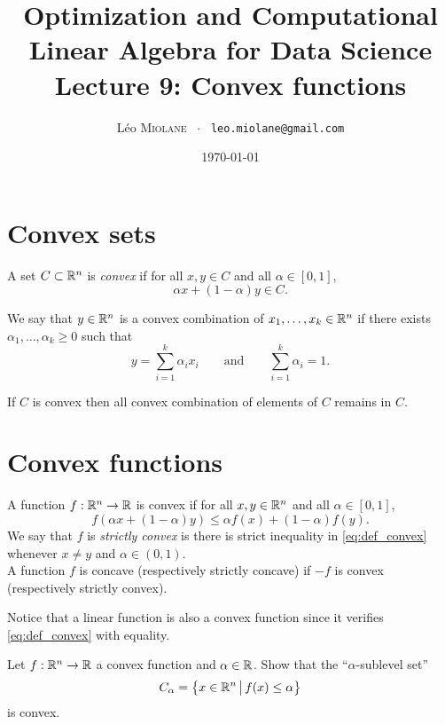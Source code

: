 \documentclass[11pt,nocut]{article}
\title{\vspace{-2.0cm}%
	Optimization and Computational Linear Algebra for Data Science\\
Lecture 9: Convex functions}
\author{Léo \textsc{Miolane} \ $\cdot$ \ \texttt{leo.miolane@gmail.com}}
\date{\today}
\begin{document}
\maketitle


\section{Convex sets}

\begin{definition}
	A set $C \subset \mathbb{R}^n$ is \emph{convex} if for all $x,y \in C$ and all $\alpha \in [0,1]$,
	$$
	\alpha x + (1-\alpha) y \in C.
	$$
\end{definition}

\begin{definition}
	We say that $y \in \mathbb{R}^n$ is a convex combination of $x_1, \dots, x_k \in \mathbb{R}^n$ if there exists $\alpha_1, \dots, \alpha_k \geq 0$ such that
	$$
	y = \sum_{i=1}^k \alpha_i x_i \qquad \text{and} \qquad \sum_{i=1}^k \alpha_i = 1.
	$$
\end{definition}

\begin{proposition}
	If $C$ is convex then all convex combination of elements of $C$ remains in $C$.
\end{proposition}

\section{Convex functions}

\begin{definition}
	A function $f: \mathbb{R}^n \to \mathbb{R}$ is convex if for all $x,y \in \mathbb{R}^n$ and all $\alpha \in [0,1]$,
	\begin{equation}\label{eq:def_convex}
	f(\alpha x + (1-\alpha) y) \leq \alpha f(x) + (1-\alpha) f(y).
\end{equation}
We say that $f$ is \emph{strictly convex} is there is strict inequality in \eqref{eq:def_convex} whenever $x \neq y$ and $\alpha \in (0,1)$.
\\
A function $f$ is concave (respectively strictly concave) if $-f$ is convex (respectively strictly convex).
\end{definition}

Notice that a linear function is also a convex function since it verifies \eqref{eq:def_convex} with equality.


\begin{exercise}
	Let $f : \mathbb{R}^n \to \mathbb{R}$ a convex function and $\alpha \in \mathbb{R}$. Show that the ``$\alpha$-sublevel set''
	$$
	C_{\alpha} = \big\{ x \in \mathbb{R}^n \, \big| \, f(x) \leq \alpha \big\}
	$$
	is convex.
\end{exercise}
\end{document}
